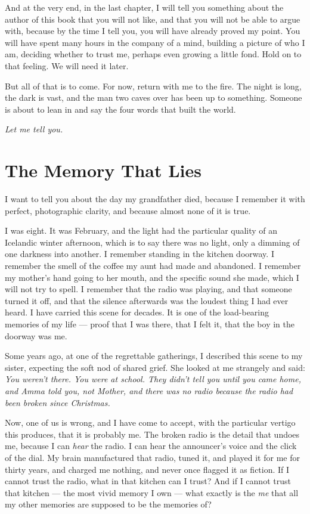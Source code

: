 And at the very end, in the last chapter, I will tell you something about the author of this book that you will not like, and that you will not be able to argue with, because by the time I tell you, you will have already proved my point. You will have spent many hours in the company of a mind, building a picture of who I am, deciding whether to trust me, perhaps even growing a little fond. Hold on to that feeling. We will need it later.

But all of that is to come. For now, return with me to the fire. The night is long, the dark is vast, and the man two caves over has been up to something. Someone is about to lean in and say the four words that built the world.

\emph{Let me tell you.}

\chapter{The Memory That Lies}

I want to tell you about the day my grandfather died, because I remember it with perfect, photographic clarity, and because almost none of it is true.

I was eight. It was February, and the light had the particular quality of an Icelandic winter afternoon, which is to say there was no light, only a dimming of one darkness into another. I remember standing in the kitchen doorway. I remember the smell of the coffee my aunt had made and abandoned. I remember my mother's hand going to her mouth, and the specific sound she made, which I will not try to spell. I remember that the radio was playing, and that someone turned it off, and that the silence afterwards was the loudest thing I had ever heard. I have carried this scene for decades. It is one of the load-bearing memories of my life — proof that I was there, that I felt it, that the boy in the doorway was me.

Some years ago, at one of the regrettable gatherings, I described this scene to my sister, expecting the soft nod of shared grief. She looked at me strangely and said: \emph{You weren't there. You were at school. They didn't tell you until you came home, and Amma told you, not Mother, and there was no radio because the radio had been broken since Christmas.}

Now, one of us is wrong, and I have come to accept, with the particular vertigo this produces, that it is probably me. The broken radio is the detail that undoes me, because I can \emph{hear} the radio. I can hear the announcer's voice and the click of the dial. My brain manufactured that radio, tuned it, and played it for me for thirty years, and charged me nothing, and never once flagged it as fiction. If I cannot trust the radio, what in that kitchen can I trust? And if I cannot trust that kitchen — the most vivid memory I own — what exactly is the \emph{me} that all my other memories are supposed to be the memories of?

